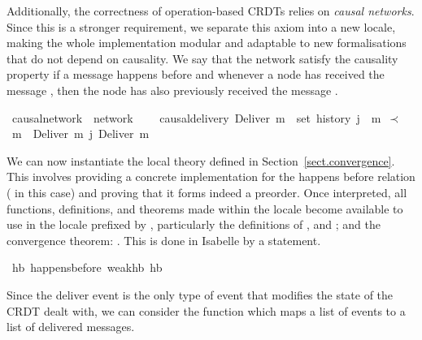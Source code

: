 \documentclass[acmlarge,review,anonymous]{acmart}\settopmatter{printfolios=true}
\begin{document}
Additionally, the correctness of operation-based CRDTs relies on \emph{causal
networks}.  Since this is a stronger requirement, we separate this axiom into a
new locale, making the whole implementation modular and adaptable to new
formalisations that do not depend on causality.  We say that the network
satisfy the causality property if a message  happens before 
and whenever a node  has received the message , then the node
has also previously received the message .

\begin{isabellebody}
\isanewline
{}\isamarkupfalse%
\ causal{\isacharunderscore}network\ {\isacharequal}\ network\ {\isacharplus}\isanewline
\ \ \ causal{\isacharunderscore}delivery{\isacharcolon}\ {\isachardoublequoteopen}Deliver\ m{}\ {\isasymin}\ set\ {\isacharparenleft}history\ j{\isacharparenright}\ {\isasymLongrightarrow}\ m{}\ $\prec$\ m{}\ {\isasymLongrightarrow}\ Deliver\ m{}\ {\isasymsqsubset}\isactrlsup j\ Deliver\ m{}{\isachardoublequoteclose}\isanewline
\end{isabellebody}

We can now instantiate the local theory  defined in
Section~\ref{sect.convergence}. This involves providing a concrete
implementation for the happens before relation ( in this case) and
proving that it forms indeed a preorder. Once interpreted, all functions,
definitions, and theorems made within the  locale become
available to use in the locale  prefixed by , particularly
the definitions of ,  and
; and the convergence theorem: .
This is done in Isabelle by a  statement.

\begin{isabellebody}
\isanewline
{}\isamarkupfalse%
\ hb{\isacharcolon}\ happens{\isacharunderscore}before\ weak{\isacharunderscore}hb\ hb\isanewline
\end{isabellebody}

Since the deliver event is the only type of event that modifies the state of
the CRDT dealt with, we can consider the function 
which maps a list of events to a list of delivered messages.
\end{document}
